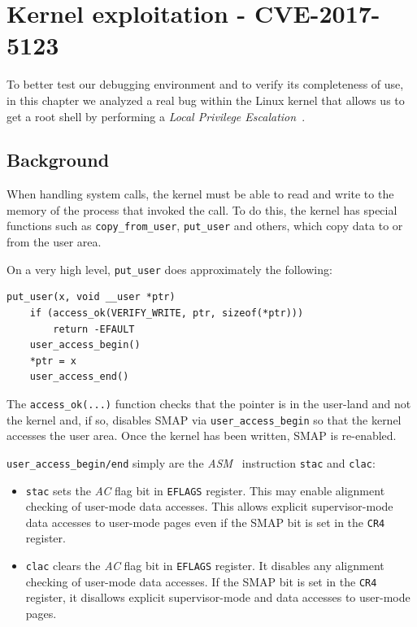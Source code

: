 \documentclass{masterthesis}
\begin{document}
\chapter{Kernel exploitation - CVE-2017-5123}
\label{ch:cve-2017}
To better test our debugging environment and to verify its completeness of use, in this chapter we analyzed a real bug within the Linux kernel that allows us to get a root shell by performing a \emph{Local Privilege Escalation}~\cite{farah2017study}.
\section{Background}
\label{sect:back-cve-2017}
When handling system calls, the kernel must be able to read and write to the memory of the process that invoked the call. To do this, the kernel has special functions such as \texttt{copy\_from\_user}, \texttt{put\_user} and others, which copy data to or from the user area.

On a very high level, \texttt{put\_user} does approximately the following:
\begin{lstlisting}
put_user(x, void __user *ptr)
    if (access_ok(VERIFY_WRITE, ptr, sizeof(*ptr)))
        return -EFAULT
    user_access_begin()
    *ptr = x
    user_access_end()
\end{lstlisting}
The \texttt{access\_ok(...)} function checks that the pointer is in the user-land and not the kernel and, if so, disables SMAP via \texttt{user\_access\_begin} so that the kernel accesses the user area. Once the kernel has been written, SMAP is re-enabled.

\texttt{user\_access\_begin/end} simply are the \textit{ASM}~\cite{salwan2014introduction} instruction \texttt{stac} and \texttt{clac}:
\begin{itemize}
\item \texttt{stac} sets the \textit{AC} flag bit in \texttt{EFLAGS} register. This may enable alignment checking of user-mode data accesses. This allows explicit supervisor-mode data accesses to user-mode pages even if the SMAP bit is set in the \texttt{CR4} register.
\item \texttt{clac} clears the \textit{AC} flag bit in \texttt{EFLAGS} register. It disables any alignment checking of user-mode data accesses. If the SMAP bit is set in the \texttt{CR4} register, it disallows explicit supervisor-mode and data accesses to user-mode pages.
\end{itemize}
\end{document}
